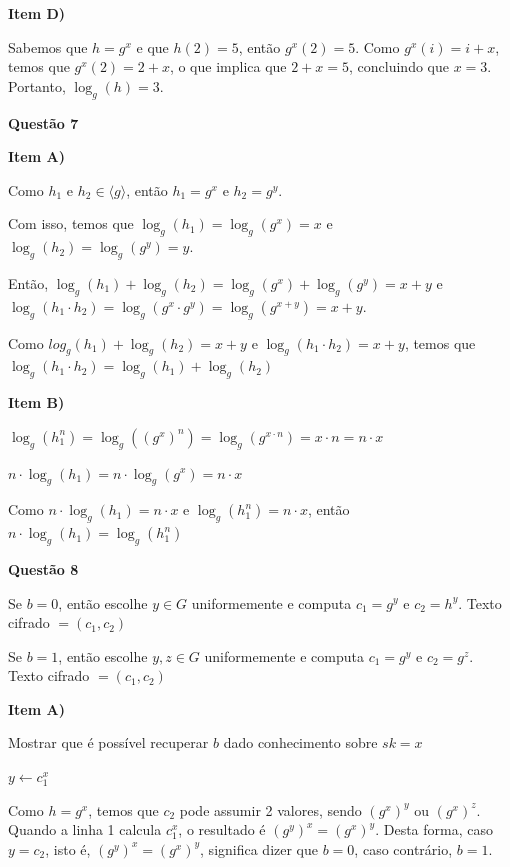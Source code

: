 \documentclass{article}
\begin{document}
\textbf{Item D)}
    
    Sabemos que $h = g^x$ e que $h(2) = 5$, então $g^x(2) = 5$. Como $g^x(i) = i + x$, temos que $g^x(2) = 2 + x$, o que implica que $2 + x = 5$, concluindo que $x = 3$. Portanto, $\log_g(h) = 3.$

\textbf{Questão 7}

\textbf{Item A)}

    Como $h_1 \text{ e } h_2 \in \langle g \rangle$, então $h_1 = g^x$ e $h_2 = g^y$.

    Com isso, temos que $\log_g(h_1) = \log_g(g^x) = x$ e $\log_g(h_2) = \log_g(g^y) = y$.

    Então, $\log_g(h_1) + \log_g(h_2) = \log_g(g^x) + \log_g(g^y) = x + y$ e 
    $\log_g(h_1 \cdot h_2) = \log_g(g^x \cdot g^y) = \log_g(g^{x+y}) = x + y$.

    Como $log_g(h_1) + \log_g(h_2) = x + y$ e $\log_g(h_1 \cdot h_2) = x + y$, temos que $\log_g(h_1 \cdot h_2) = \log_g(h_1) + \log_g(h_2)$

\textbf{Item B)}

    $\log_g(h_1^n) = \log_g((g^x)^n) = \log_g(g^{x \cdot n}) = x \cdot n = n \cdot x$

    $n \cdot \log_g(h_1) = n \cdot \log_g(g^x) = n \cdot x$

    Como $n \cdot \log_g(h_1) = n \cdot x$ e $\log_g(h_1^n) = n \cdot x$, então $n \cdot \log_g(h_1) = \log_g(h_1^n)$


\textbf{Questão 8}

    Se $b = 0$, então escolhe $y \in G$ uniformemente e computa $c_1 = g^y$ e $c_2 = h^y$. Texto cifrado $= (c_1,c_2)$

    Se $b = 1$, então escolhe $y, z \in G$ uniformemente e computa $c_1 = g^y$ e $c_2 = g^z$. Texto cifrado $= (c_1,c_2)$

\textbf{Item A)}

    Mostrar que é possível recuperar $b$ dado conhecimento sobre $sk = x$

    \begin{algorithm}[H]
        \caption{$Dec_k$}

        $y \leftarrow c_1^x$

        
    \end{algorithm}    

    Como $h = g^x$, temos que $c_2$ pode assumir 2 valores, sendo $(g^x)^y$ ou $(g^x)^z$. Quando a linha 1 calcula $c_1^x$, o resultado é $(g^y)^x = (g^x)^y$. Desta forma, caso $y = c_2$, isto é, $(g^y)^x = (g^x)^y$, significa dizer que $b = 0$, caso contrário, $b = 1$.
\end{document}
